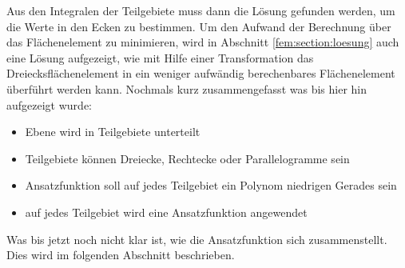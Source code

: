 Aus den Integralen der Teilgebiete muss dann die Lösung gefunden
werden, um die Werte in den Ecken zu bestimmen.
Um den Aufwand der Berechnung über das Flächenelement zu minimieren,
wird in Abschnitt \ref{fem:section:loesung} auch eine Lösung
aufgezeigt, wie mit Hilfe einer Transformation das Dreiecksflächenelement
in ein weniger aufwändig berechenbares Flächenelement überführt
werden kann.
Nochmals kurz zusammengefasst was bis hier hin aufgezeigt wurde:
\begin{itemize}
	\item Ebene wird in Teilgebiete unterteilt
	\item Teilgebiete können Dreiecke, Rechtecke oder Parallelogramme sein
	\item Ansatzfunktion soll auf jedes Teilgebiet ein Polynom
	niedrigen Gerades sein
	\item auf jedes Teilgebiet wird eine Ansatzfunktion angewendet
\end{itemize} 
Was bis jetzt noch nicht klar ist, wie die Ansatzfunktion sich zusammenstellt.
Dies wird im folgenden Abschnitt beschrieben.





